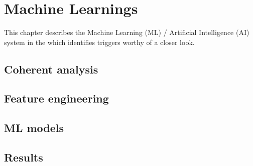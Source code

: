 \chapter{Machine Learnings}
\label{ch:ml}

\par This chapter describes the Machine Learning (ML) / Artificial Intelligence (AI) system in the \vf which identifies triggers worthy of a closer look. 

\section {Coherent analysis}

\section {Feature engineering}


\section {ML models}


\section {Results}
